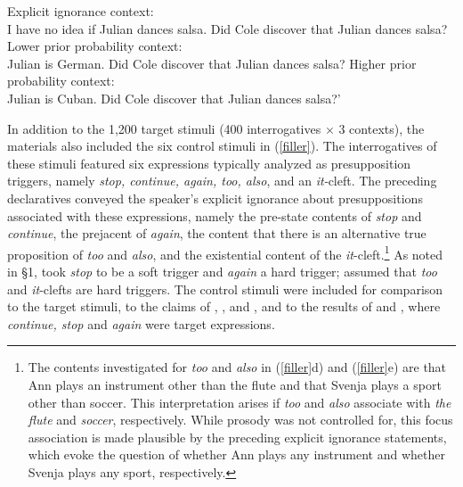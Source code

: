 \documentclass[11pt,fleqn]{article}
\newcommand{\6}{\mbox{$[\hspace*{-.6mm}[$}}
\newcommand{\9}{\mbox{$]\hspace*{-.6mm}]$}}
\begin{document}
\begin{exe}
\ex\label{sample}
\begin{xlist}
\ex Explicit ignorance context: \\ I have no idea if Julian dances salsa. Did Cole discover that Julian dances salsa?
\ex Lower prior probability context: \\ Julian is German. Did Cole discover that Julian dances salsa?
\ex Higher prior probability context: \\ Julian is Cuban. Did Cole discover that Julian dances salsa?'
\end{xlist}
\end{exe}

In addition to the 1,200 target stimuli (400 interrogatives $\times$ 3 contexts), the materials also included the six control stimuli in (\ref{filler}). The interrogatives of these stimuli featured six expressions typically analyzed as presupposition triggers, namely {\em stop, continue, again, too, also}, and an {\em it-}cleft. The preceding declaratives conveyed the speaker's explicit ignorance about presuppositions associated with these expressions, namely the pre-state contents of \emph{stop} and \emph{continue}, the prejacent of \emph{again}, the content that there is an alternative true proposition of \emph{too} and \emph{also}, and the existential content of the \emph{it}-cleft.\footnote{The contents investigated for {\em too} and {\em also} in (\ref{filler}d) and (\ref{filler}e) are that Ann plays an instrument other than the flute and that Svenja plays a sport other than soccer. This interpretation arises if {\em too} and {\em also} associate with {\em the flute} and {\em soccer}, respectively. While prosody was not controlled for, this focus association is made plausible by the preceding explicit ignorance statements, which evoke the question of whether Ann plays any instrument and whether Svenja plays any sport, respectively.}  As noted in \S1, \citealt{simons01} took {\em stop} to be a soft trigger and \emph{again} a hard trigger; \citealt{abusch10} assumed that \emph{too} and \emph{it}-clefts are hard triggers. The control stimuli were included for comparison to the target stimuli, to the claims of \citealt{simons01}, \citealt{abusch10}, \citealt{abrusan2016} and \citealt{roberts-simons2024}, and to the results of \citealt[Exp.~3]{mandelkern-etal2020} and \citealt[Exps.~1-2]{kalomoiros-schwarz2024}, where  \emph{continue, stop} and \emph{again} were target expressions. 

\end{document}
